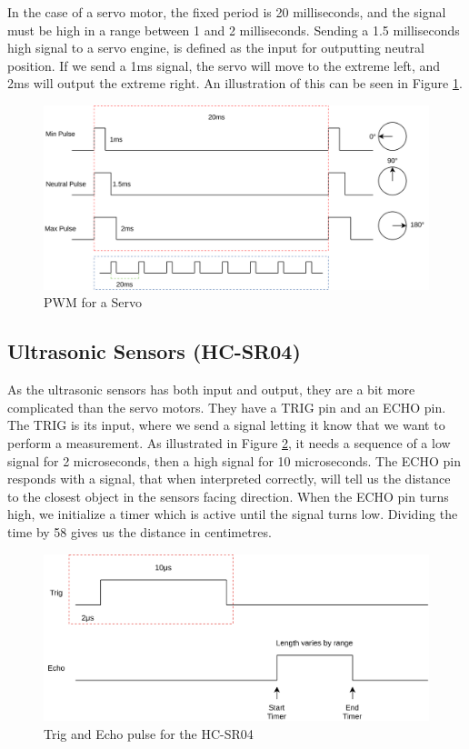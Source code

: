 \documentclass{article}
\begin{document}
In the case of a servo motor, the fixed period is 20 milliseconds, and the signal must be high in a range between 1 and 2 milliseconds. Sending a 1.5 milliseconds high signal to a servo engine, is defined as the input for outputting neutral position. If we send a 1ms signal, the servo will move to the extreme left, and 2ms will output the extreme right. An illustration of this can be seen in Figure \ref{servo}.

\begin{figure}[H]
	\centering
	\includegraphics[width=\linewidth]{servo.png}
	\caption{PWM for a Servo}
	\label{servo}
\end{figure}

\subsection{Ultrasonic Sensors (HC-SR04)}
As the ultrasonic sensors has both input and output, they are a bit more complicated than the servo motors. They have a TRIG pin and an ECHO pin.\\

The TRIG is its input, where we send a signal letting it know that we want to perform a measurement. As illustrated in Figure \ref{ultrasonic-sensor}, it needs a sequence of a low signal for 2 microseconds, then a high signal for 10 microseconds. The ECHO pin responds with a signal, that when interpreted correctly, will tell us the distance to the closest object in the sensors facing direction. When the ECHO pin turns high, we initialize a timer which is active until the signal turns low. Dividing the time by 58 gives us the distance in centimetres.\\

\begin{figure}[H]
	\centering
	\includegraphics[width=\linewidth]{ultrasonic-sensor.png}
	\caption{Trig and Echo pulse for the HC-SR04}
	\label{ultrasonic-sensor}
\end{figure}
\end{document}
